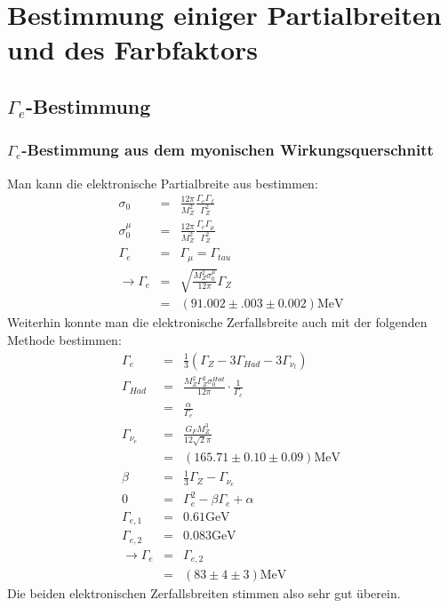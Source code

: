 \section{Bestimmung einiger Partialbreiten und des Farbfaktors}
\subsection{$\Gamma_e$-Bestimmung}
\subsubsection{$\Gamma_e$-Bestimmung aus dem myonischen Wirkungsquerschnitt}
Man kann die elektronische Partialbreite aus \cite[Gl.5]{script} bestimmen:
\begin{eqnarray}
 \sigma_0 &=& \frac{12\pi}{M_Z^2}\frac{\Gamma_e\Gamma_f}{\Gamma_Z^2}\\
 \sigma_0^{\mu} &=& \frac{12\pi}{M_Z^2}\frac{\Gamma_e\Gamma_{\mu}}{\Gamma_Z^2}\\
 \Gamma_e &=& \Gamma_{\mu} = \Gamma_{tau}\\
 \rightarrow \Gamma_e &=& \sqrt{\frac{M_Z^2\sigma_0^{\mu}}{12\pi}}\Gamma_Z\\
 &=& (91.002 \pm .003 \pm 0.002)\si{\mega\electronvolt}				%
\end{eqnarray}
Weiterhin konnte man die elektronische Zerfallsbreite auch mit der folgenden Methode bestimmen:
\begin{eqnarray}
\Gamma_e &=& \frac{1}{3}(\Gamma_Z - 3\Gamma_{Had} - 3\Gamma_{\nu_l})\\
\Gamma_{Had} &=& \frac{M_Z^2\Gamma_Z^2\sigma_0^{Had}}{12\pi}\cdot\frac{1}{\Gamma_e}\\
&=& \frac{\alpha}{\Gamma_e}\\
\Gamma_{\nu_e} &=& \frac{G_FM_Z^3}{12\sqrt{2}\pi}\\
&=& (165.71 \pm 0.10 \pm 0.09)\si{\mega\electronvolt}\\
\beta &=& \frac{1}{3}\Gamma_Z - \Gamma_{\nu_e}\\
0 &=& \Gamma_e^2 - \beta\Gamma_e + \alpha\\
\Gamma_{e,1} &=& 0.61\si{\giga\electronvolt}\\
\Gamma_{e,2} &=& 0.083\si{\giga\electronvolt}\\
\rightarrow \Gamma_e &=& \Gamma_{e,2}\\
&=& (83 \pm 4 \pm 3) \si{\mega\electronvolt}
\end{eqnarray}
Die beiden elektronischen Zerfallsbreiten stimmen also sehr gut überein.